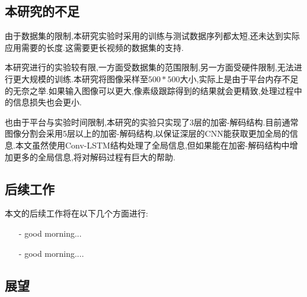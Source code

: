 \subsection{本研究的不足}
由于数据集的限制,本研究实验时采用的训练与测试数据序列都太短,还未达到实际应用需要的长度.这需要更长视频的数据集的支持.
\par
本研究进行的实验较有限,一方面受数据集的范围限制,另一方面受硬件限制,无法进行更大规模的训练.本研究将图像采样至$500*500$大小,实际上是由于平台内存不足的无奈之举.如果输入图像可以更大,像素级跟踪得到的结果就会更精致,处理过程中的信息损失也会更小.
\par
也由于平台与实验时间限制,本研究的实验只实现了3层的加密-解码结构.目前通常图像分割会采用5层以上的加密-解码结构,以保证深层的CNN能获取更加全局的信息.本文虽然使用Conv-LSTM结构处理了全局信息,但如果能在加密-解码结构中增加更多的全局信息,将对解码过程有巨大的帮助.
\subsection{后续工作}
本文的后续工作将在以下几个方面进行:
\begin{itemize}
    \item[-] good morning...
    \item[-] good morning....
\end{itemize}
\subsection{展望}

